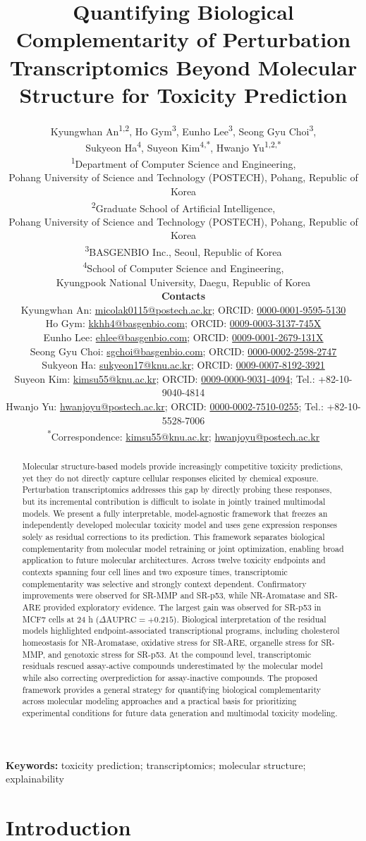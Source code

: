 \documentclass[11pt,a4paper]{article}
\title{Quantifying Biological Complementarity of Perturbation Transcriptomics Beyond Molecular Structure for Toxicity Prediction}
\author{%
  Kyungwhan An\textsuperscript{1,2},
  Ho Gym\textsuperscript{3},
  Eunho Lee\textsuperscript{3},
  Seong Gyu Choi\textsuperscript{3},\\
  Sukyeon Ha\textsuperscript{4},
  Suyeon Kim\textsuperscript{4,*},
  Hwanjo Yu\textsuperscript{1,2,*}\\[0.5em]
  \small\textsuperscript{1}Department of Computer Science and Engineering,\\
  \small Pohang University of Science and Technology (POSTECH), Pohang,
  Republic of Korea\\
  \small\textsuperscript{2}Graduate School of Artificial Intelligence,\\
  \small Pohang University of Science and Technology (POSTECH), Pohang,
  Republic of Korea\\
  \small\textsuperscript{3}BASGENBIO Inc., Seoul, Republic of Korea\\
  \small\textsuperscript{4}School of Computer Science and Engineering,\\
  \small Kyungpook National University, Daegu, Republic of Korea\\[0.5em]
  \small\textbf{Contacts}\\
  \small Kyungwhan An:
  \href{mailto:micolak0115@postech.ac.kr}{micolak0115@postech.ac.kr};
  ORCID: \href{https://orcid.org/0000-0001-9595-5130}{0000-0001-9595-5130}\\
  \small Ho Gym:
  \href{mailto:kkhh4@basgenbio.com}{kkhh4@basgenbio.com};
  ORCID: \href{https://orcid.org/0009-0003-3137-745X}{0009-0003-3137-745X}\\
  \small Eunho Lee:
  \href{mailto:ehlee@basgenbio.com}{ehlee@basgenbio.com};
  ORCID: \href{https://orcid.org/0009-0001-2679-131X}{0009-0001-2679-131X}\\
  \small Seong Gyu Choi:
  \href{mailto:sgchoi@basgenbio.com}{sgchoi@basgenbio.com};
  ORCID: \href{https://orcid.org/0000-0002-2598-2747}{0000-0002-2598-2747} \\
  \small Sukyeon Ha:
  \href{mailto:sukyeon17@knu.ac.kr}
  {sukyeon17@knu.ac.kr};
  ORCID: \href{https://orcid.org/0009-0007-8192-3921}{0009-0007-8192-3921} \\
  \small Suyeon Kim:
  \href{mailto:kimsu55@knu.ac.kr}{kimsu55@knu.ac.kr};
  ORCID: \href{https://orcid.org/0009-0000-9031-4094}{0009-0000-9031-4094};
  Tel.: +82-10-9040-4814\\
  \small Hwanjo Yu:
  \href{mailto:hwanjoyu@postech.ac.kr}{hwanjoyu@postech.ac.kr};
  ORCID: \href{https://orcid.org/0000-0002-7510-0255}{0000-0002-7510-0255};
  Tel.: +82-10-5528-7006\\[0.5em]
  \small\textsuperscript{*}Correspondence:
  \href{mailto:kimsu55@knu.ac.kr}{kimsu55@knu.ac.kr};
  \href{mailto:hwanjoyu@postech.ac.kr}{hwanjoyu@postech.ac.kr}
}
\date{}
\begin{document}
\doublespacing

\maketitle
\linenumbers

\begin{abstract}

Molecular structure-based models provide increasingly competitive toxicity
predictions, yet they do not directly capture cellular responses elicited by
chemical exposure. Perturbation transcriptomics addresses this gap by directly
probing these responses, but its incremental contribution is difficult to
isolate in jointly trained multimodal models. We present a fully interpretable,
model-agnostic framework that freezes an independently developed
molecular toxicity model and uses gene expression responses solely as residual corrections to its prediction. This framework separates biological complementarity
from molecular model retraining or joint optimization, enabling broad
application to future molecular architectures. Across twelve toxicity endpoints and contexts spanning four
cell lines and two exposure times, transcriptomic complementarity was selective
and strongly context dependent. Confirmatory improvements were observed for
SR-MMP and SR-p53, while NR-Aromatase and SR-ARE provided exploratory evidence.
The largest gain was observed for SR-p53 in MCF7 cells at 24 h (\(\Delta\mathrm{AUPRC}=+0.215\)). Biological interpretation of the residual models highlighted endpoint-associated transcriptional programs, including cholesterol homeostasis for NR-Aromatase, oxidative stress for SR-ARE, organelle stress for SR-MMP, and genotoxic stress for SR-p53. At the compound level, transcriptomic residuals rescued assay-active compounds underestimated by the molecular model while also correcting overprediction for assay-inactive compounds. The proposed framework provides a general strategy for quantifying biological complementarity across molecular modeling approaches and a practical basis for prioritizing experimental conditions for future data generation and multimodal toxicity modeling.

\end{abstract}

\noindent\textbf{Keywords:} toxicity prediction; transcriptomics; molecular structure; explainability

\section{Introduction}
\end{document}
